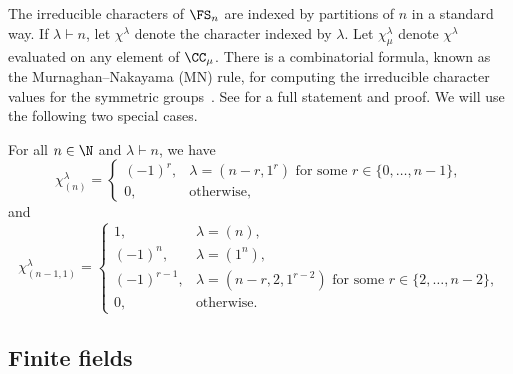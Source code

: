The irreducible characters of \(\FS_n\) are indexed by partitions of \(n\) in a standard way.
If $\lambda \vdash n$, let $\chi^\lambda$ denote the character indexed by $\lambda$.
Let $\chi^\lambda_\mu$ denote $\chi^\lambda$ evaluated on any element of \(\CC_\mu\).
There is a combinatorial formula, known as the Murnaghan--Nakayama (MN) rule, for computing the irreducible character values for the symmetric groups~\cite{murnaghan, nakayama}. See \cite[Theorem~7.17.3]{EC2} for a full statement and proof.
We will use the following two special cases.



\begin{samepage}
\begin{corollary} \label{MNrule_ncycle}
For all \(n \in \N\) and \(\lambda \vdash n\), we have
\begin{equation}
\chi^\lambda_{(n)} =
\begin{cases}
(-1)^r, & \lambda = (n-r,1^r) \text{ for some } r \in \{0,\ldots,n-1\}, \\
0, & \text{otherwise},
\end{cases}
\end{equation}
and
\begin{equation}
\chi^\lambda_{(n-1,1)} = \begin{cases}
1,          & \lambda = (n), \\
(-1)^n,     & \lambda = (1^n), \\
(-1)^{r-1}, & \lambda = (n-r, 2, 1^{r-2}) \text{ for some } r \in \{2,\ldots,n-2\}, \\
0,          & \text{otherwise}.
\end{cases}
\end{equation}
\end{corollary}
\end{samepage}























\subsection{Finite fields}

